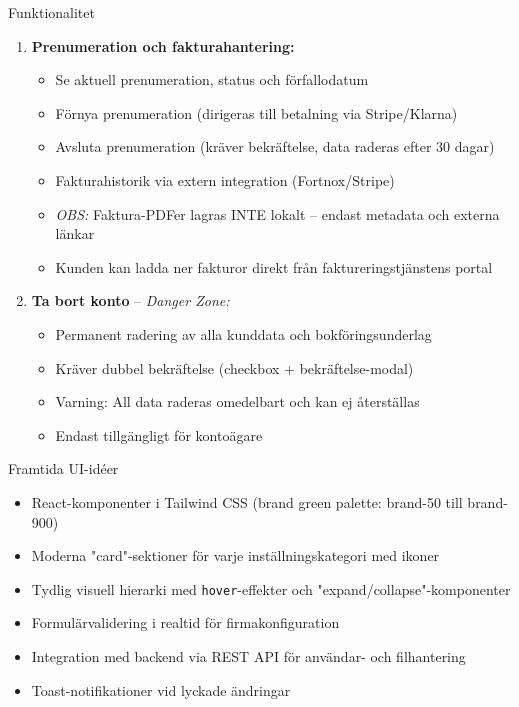 \documentclass[10pt]{beamer}
\begin{document}
\begin{frame}[fragile]
\begin{block}{Funktionalitet}
\begin{enumerate}
      \item \textbf{Prenumeration och fakturahantering:}
        \begin{itemize}
          \item Se aktuell prenumeration, status och förfallodatum
          \item Förnya prenumeration (dirigeras till betalning via Stripe/Klarna)
          \item Avsluta prenumeration (kräver bekräftelse, data raderas efter 30 dagar)
          \item Fakturahistorik via extern integration (Fortnox/Stripe)
          \item \textit{OBS:} Faktura-PDFer lagras INTE lokalt – endast metadata och externa länkar
          \item Kunden kan ladda ner fakturor direkt från faktureringstjänstens portal
        \end{itemize}
      \vspace{0.2cm}
      
      \item \textbf{Ta bort konto} – \textit{Danger Zone:}
        \begin{itemize}
          \item Permanent radering av alla kunddata och bokföringsunderlag
          \item Kräver dubbel bekräftelse (checkbox + bekräftelse-modal)
          \item Varning: All data raderas omedelbart och kan ej återställas
          \item Endast tillgängligt för kontoägare
        \end{itemize}
    \end{enumerate}
  \end{block}

  \vspace{0.4cm}

  \begin{block}{Framtida UI-idéer}
    \begin{itemize}
      \item React-komponenter i Tailwind CSS (brand green palette: brand-50 till brand-900)
      \item Moderna "card"-sektioner för varje inställningskategori med ikoner
      \item Tydlig visuell hierarki med \texttt{hover}-effekter och "expand/collapse"-komponenter
      \item Formulärvalidering i realtid för firmakonfiguration
      \item Integration med backend via REST API för användar- och filhantering
      \item Toast-notifikationer vid lyckade ändringar
    \end{itemize}
  \end{block}
\end{frame}
\end{document}
